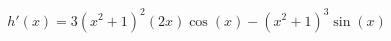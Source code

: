 \documentclass[preview]{standalone}
\begin{document}
\begin{align*}
h'(x) = 3(x^2+1)^2(2x)\cos(x) - (x^2+1)^3\sin(x)
\end{align*}
\end{document}
